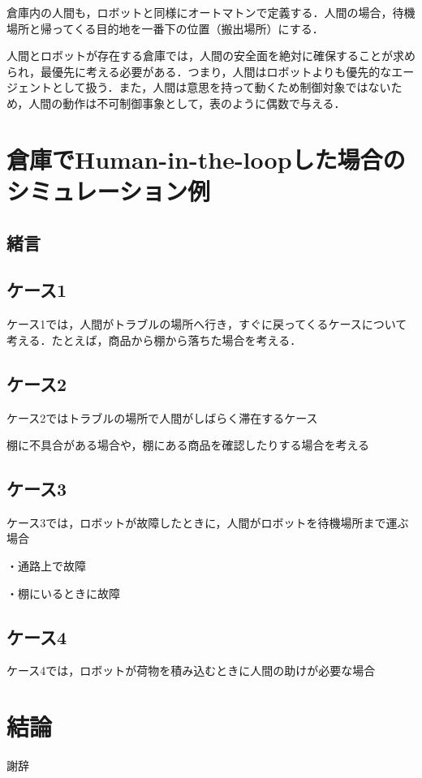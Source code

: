 \documentclass[dvipdfmx]{newthesis}
\begin{document}
倉庫内の人間も，ロボットと同様にオートマトンで定義する．人間の場合，待機場所と帰ってくる目的地を一番下の位置（搬出場所）にする．

人間とロボットが存在する倉庫では，人間の安全面を絶対に確保することが求められ，最優先に考える必要がある．つまり，人間はロボットよりも優先的なエージェントとして扱う．また，人間は意思を持って動くため制御対象ではないため，人間の動作は不可制御事象として，表のように偶数で与える．



\chapter{倉庫でHuman-in-the-loopした場合のシミュレーション例}

\setcounter{section}{-1}

\section{緒言}

\section{ケース1}

ケース1では，人間がトラブルの場所へ行き，すぐに戻ってくるケースについて考える．たとえば，商品から棚から落ちた場合を考える．

\section{ケース2}

ケース2ではトラブルの場所で人間がしばらく滞在するケース

棚に不具合がある場合や，棚にある商品を確認したりする場合を考える

\section{ケース3}

ケース3では，ロボットが故障したときに，人間がロボットを待機場所まで運ぶ場合

・通路上で故障

・棚にいるときに故障

\section{ケース4}

ケース4では，ロボットが荷物を積み込むときに人間の助けが必要な場合


\chapter{結論}

\begin{acknowledgment}
謝辞
\end{acknowledgment}

\thesisbib
\end{document}
